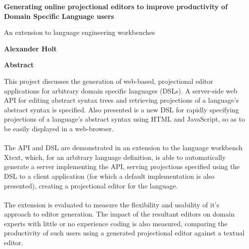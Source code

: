 \documentclass{article}
\begin{document}
\clearpage
%
\thispagestyle{plain}
\begin{center}
    \Large
    \textbf{Generating online projectional editors to improve productivity of Domain Specific Language users}
    
    \vspace{0.4cm}
    \large
    An extension to language engineering workbenches
    
    \vspace{0.4cm}
    \textbf{Alexander Holt}
    
    \vspace{0.9cm}
    \textbf{Abstract}
\end{center}
This project discusses the generation of web-based, projectional editor applications for arbitrary domain specific languages (DSLs). A server-side web API for editing abstract syntax trees and retrieving projections of a language's abstract syntax is specified. Also presented is a new DSL for rapidly specifying projections of a language's abstract syntax using HTML and JavaScript, so as to be easily displayed in a web-browser. 
\\
\\
The API and DSL are demonstrated in an extension to the language workbench Xtext, which, for an arbitrary language definition, is able to automatically generate a server implementing the API, serving projections specified using the DSL to a client application (for which a default implementation is also presented), creating a projectional editor for the language.
\\
\\
The extension is evaluated to measure the flexibility and usability of it's approach to editor generation. The impact of the resultant editors on domain experts with little or no experience coding is also measured, comparing the productivity of such users using a generated projectional editor against a textual editor. 



\end{document}

